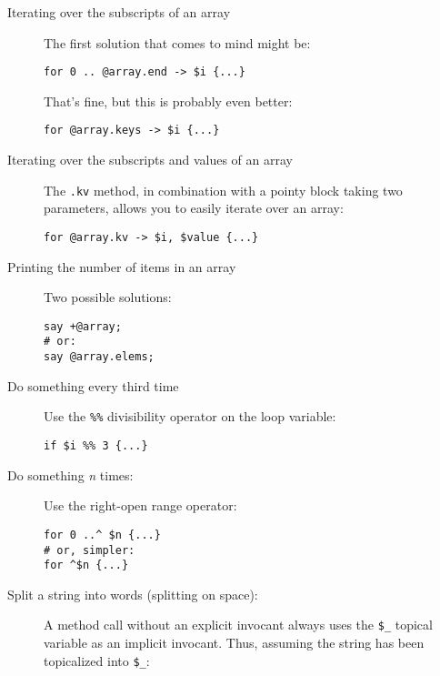 \begin{description}
\item[Iterating over the subscripts of an array] The first 
solution that comes to mind might be:

\begin{verbatim}
for 0 .. @array.end -> $i {...}
\end{verbatim}

That's fine, but this is probably even better:

\begin{verbatim}
for @array.keys -> $i {...}
\end{verbatim}

\item[Iterating over the subscripts and values of an array] 
The \verb'.kv' method, in combination with a pointy block 
taking two parameters, allows you to easily iterate over an 
array:

\begin{verbatim}
for @array.kv -> $i, $value {...}
\end{verbatim}


\item[Printing the number of items in an array] Two possible 
solutions:

\begin{verbatim}
say +@array; 
# or:
say @array.elems; 
\end{verbatim}

\item[Do something every third time] Use the \verb'%%' 
divisibility operator on the loop variable:
\begin{verbatim}
if $i %% 3 {...}  
\end{verbatim}

\item[Do something \emph{n} times:] Use the right-open range operator:

\begin{verbatim}
for 0 ..^ $n {...}
# or, simpler:
for ^$n {...} 
\end{verbatim}

\item[Split a string into words (splitting on space):] 
A method call without an explicit invocant always uses 
the \verb'$_' topical variable as an implicit invocant. Thus, 
assuming the string has been topicalized into \verb'$_':


\end{description}
